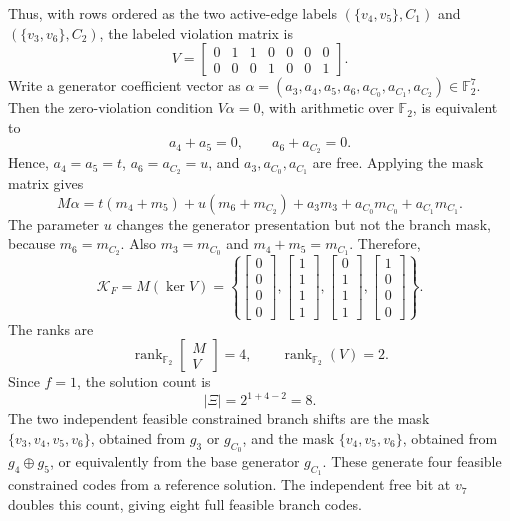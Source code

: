 Thus, with rows ordered as the two active-edge labels $(\{v_4, v_5\},C_1)$ and $(\{v_3, v_6\},C_2)$, the labeled violation matrix is
\[
V=
\begin{bmatrix}
0&1&1&0&0&0&0\\
0&0&0&1&0&0&1
\end{bmatrix}.
\]
Write a generator coefficient vector as $\alpha = (a_3,a_4,a_5,a_6,a_{C_0},a_{C_1},a_{C_2}) \in \mathbb{F}_2^7$. Then the zero-violation condition $V\alpha = 0$, with arithmetic over $\mathbb{F}_2$, is equivalent to
\[
a_4+a_5=0,
\qquad
a_6+a_{C_2}=0.
\]
Hence, $a_4=a_5=t$, $a_6=a_{C_2}=u$, and $a_3,a_{C_0},a_{C_1}$ are free. Applying the mask matrix gives
\[
M\alpha
=
t(m_4+m_5)+u(m_6+m_{C_2})+a_3m_3+a_{C_0}m_{C_0}+a_{C_1}m_{C_1}.
\]
The parameter $u$ changes the generator presentation but not the branch mask, because $m_6=m_{C_2}$. Also $m_3=m_{C_0}$ and $m_4+m_5=m_{C_1}$. Therefore,
\[
\mathcal{K}_F
=
M(\ker V)
=
\left\{
\begin{bmatrix}0\\0\\0\\0\end{bmatrix},
\begin{bmatrix}1\\1\\1\\1\end{bmatrix},
\begin{bmatrix}0\\1\\1\\1\end{bmatrix},
\begin{bmatrix}1\\0\\0\\0\end{bmatrix}
\right\}.
\]
The ranks are
\[
\operatorname{rank}_{\mathbb{F}_2}\begin{bmatrix} M \\ V \end{bmatrix}=4,
\qquad
\operatorname{rank}_{\mathbb{F}_2}(V)=2.
\]
Since $f=1$, the solution count is
\[
\lvert \Xi \rvert = 2^{1+4-2} = 8.
\]
The two independent feasible constrained branch shifts are the mask $\{v_3,v_4,v_5,v_6\}$, obtained from $g_3$ or $g_{C_0}$, and the mask $\{v_4, v_5, v_6\}$, obtained from $g_4\oplus g_5$, or equivalently from the base generator $g_{C_1}$. These generate four feasible constrained codes from a reference solution. The independent free bit at $v_7$ doubles this count, giving eight full feasible branch codes.

